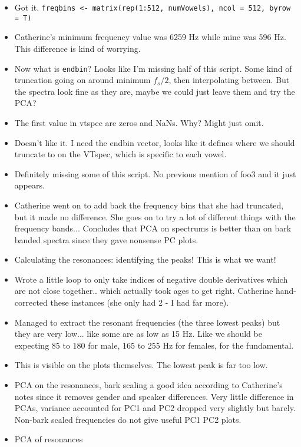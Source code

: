 \documentclass{article}
\begin{document}
\begin{itemize}
\begin{itemize}
        \item Got it. \verb|freqbins <- matrix(rep(1:512, numVowels), ncol = 512, byrow = T)|
        \item Catherine's minimum frequency value was 6259 Hz while mine was 596 Hz. This difference is kind of worrying.
        \item Now what is \verb|endbin|? Looks like I'm missing half of this script. Some kind of truncation going on around minimum $f_s / 2$, then interpolating between. But the spectra look fine as they are, maybe we could just leave them and try the PCA?
        \item The first value in vtspec are zeros and NaNs. Why? Might just omit.
        \item Doesn't like it. I need the endbin vector, looks like it defines where we should truncate to on the VTspec, which is specific to each vowel.
        \item Definitely missing some of this script. No previous mention of foo3 and it just appears.
        \item Catherine went on to add back the frequency bins that she had truncated, but it made no difference. She goes on to try a lot of different things with the frequency bands... Concludes that PCA on spectrums is better than on bark banded spectra since they gave nonsense PC plots.
        \item Calculating the resonances: identifying the peaks! This is what we want!
        \item Wrote a little loop to only take indices of negative double derivatives which are not close together.. which actually took ages to get right. Catherine hand-corrected these instances (she only had 2 - I had far more).
        \item Managed to extract the resonant frequencies (the three lowest peaks) but they are very low... like some are as low as 15 Hz. Like we should be expecting 85 to 180 for male, 165 to 255 Hz for females, for the fundamental.
        \item This is visible on the plots themselves. The lowest peak is far too low.
        \item PCA on the resonances, bark scaling a good idea according to Catherine's notes since it removes gender and speaker differences. Very little difference in PCAs, variance accounted for PC1 and PC2 dropped very slightly but barely. Non-bark scaled frequencies do not give useful PC1 PC2 plots.
        \item PCA of resonances

\end{itemize}
\end{itemize}
\end{document}
